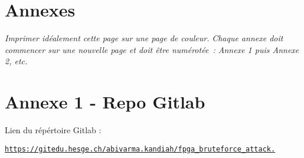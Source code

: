 \stopcontents[default]
\resumecontents[annexes]
\chapter*{Annexes}

\begin{center}
\textit{Imprimer idéalement cette page sur une page de couleur.}
\textit{Chaque annexe doit commencer sur une nouvelle page et doit être numérotée : Annexe 1 puis Annexe 2, etc.}
\end{center}


\chapter*{Annexe 1 - Repo Gitlab}

Lien du répértoire Gitlab :

\href{https://gitedu.hesge.ch/abivarma.kandiah/fpga_bruteforce_attack}{\texttt{https://gitedu.hesge.ch/abivarma.kandiah/fpga\_bruteforce\_attack.}}


\stopcontents[annexes]
\resumecontents[default]
